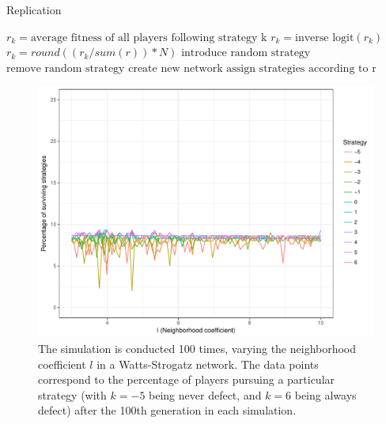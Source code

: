\documentclass[12pt]{article}
\begin{document}
\begin{algorithm}
\caption{Replication}
\label{Algorithm4}
	\begin{algorithmic}
		\State $r_k=\text{average fitness of all players following strategy k}$
		\State $r_k=\text{inverse logit}(r_k)$
		\EndFor
		\State $r_k=round((r_{k}/sum(r))*N)$
		\EndFor
		\State $\text{introduce random strategy}$
		\EndWhile
		\State $\text{remove random strategy}$
		\EndWhile
		\State $\text{create new network}$
		\State $\text{assign strategies according to r}$
		\EndFunction
	\end{algorithmic}
\end{algorithm}

\begin{figure}
    \centering
    \includegraphics[width=\linewidth]{../figures/results_WS_300_nei_100sims.pdf}
    \caption{The simulation is conducted 100 times, varying the neighborhood coefficient $l$ in a Watts-Strogatz network. The data points correspond to the percentage of players pursuing a particular strategy (with $k=-5$ being never defect, and $k=6$ being always defect) after the 100th generation in each simulation.}
    \label{WS_300_l_100sims}
\end{figure}
\end{document}
